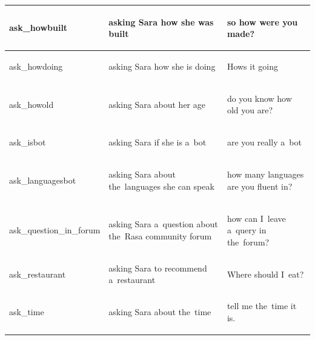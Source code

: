 \documentclass[bsc,frontabs,singlespacing,parskip,deptreport]{infthesis}
\begin{document}
{\begin{center}
\begin{longtable}{p{}|p{}|p{}}
    \hline
    \begin{spverbatim}ask_howbuilt\end{spverbatim} & asking Sara how she was built & \begin{spverbatim}so how were you made?\end{spverbatim} \\
    \hline
    \begin{spverbatim}ask_howdoing\end{spverbatim} & asking Sara how she is doing & \begin{spverbatim}Hows it going\end{spverbatim} \\
    \hline
    \begin{spverbatim}ask_howold\end{spverbatim} & asking Sara about her age & \begin{spverbatim}do you know how old you are?\end{spverbatim} \\
    \hline
    \begin{spverbatim}ask_isbot\end{spverbatim} & asking Sara if she is a~bot & \begin{spverbatim}are you really a~bot\end{spverbatim} \\
    \hline
    \begin{spverbatim}ask_languagesbot\end{spverbatim} & asking Sara about the~languages she can speak & \begin{spverbatim}how many languages are you fluent in?\end{spverbatim} \\
    \hline
    \begin{spverbatim}ask_question_in_forum\end{spverbatim} & asking Sara a~question about the~Rasa community forum & \begin{spverbatim}how can I~leave a~query in the~forum?\end{spverbatim} \\
    \hline
    \begin{spverbatim}ask_restaurant\end{spverbatim} & asking Sara to recommend a~restaurant & \begin{spverbatim}Where should I~eat?\end{spverbatim} \\
    \hline
    \begin{spverbatim}ask_time\end{spverbatim} & asking Sara about the~time & \begin{spverbatim}tell me the~time it is.\end{spverbatim} \\

\end{longtable}
\end{center}}
\end{document}
